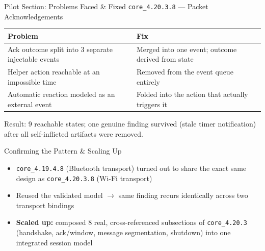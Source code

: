 \documentclass{beamer}
\begin{document}
\begin{frame}{Pilot Section: Problems Faced \& Fixed}
\texttt{core\_4.20.3.8} — Packet Acknowledgements
\vspace{0.3cm}
\begin{center}
\small
\begin{tabular}{p{4.6cm}p{5.6cm}}
\toprule
\textbf{Problem} & \textbf{Fix} \\
\midrule
Ack outcome split into 3 separate injectable events & Merged into one event; outcome derived from state \\
\addlinespace
Helper action reachable at an impossible time & Removed from the event queue entirely \\
\addlinespace
Automatic reaction modeled as an external event & Folded into the action that actually triggers it \\
\bottomrule
\end{tabular}
\end{center}
\vspace{0.3cm}
Result: 9 reachable states; one genuine finding survived (stale timer
notification) after all self-inflicted artifacts were removed.
\end{frame}

\begin{frame}{Confirming the Pattern \& Scaling Up}
\begin{itemize}
  \item \texttt{core\_4.19.4.8} (Bluetooth transport) turned out to share
        the exact same design as \texttt{core\_4.20.3.8} (Wi-Fi transport)
  \item Reused the validated model $\rightarrow$ same finding recurs
        identically across two transport bindings
  \item \textbf{Scaled up:} composed 8 real, cross-referenced subsections
        of \texttt{core\_4.20.3} (handshake, ack/window, message
        segmentation, shutdown) into one integrated session model
\end{itemize}
\end{frame}
\end{document}
